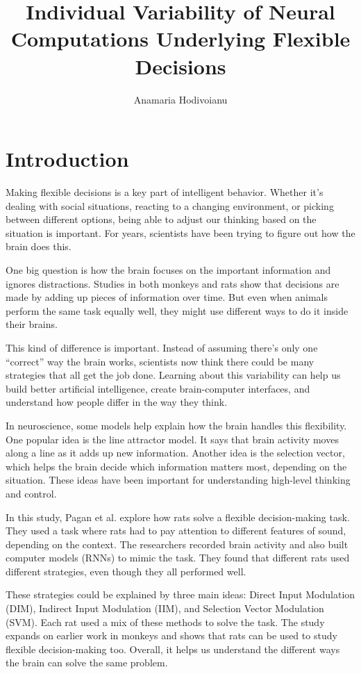 \documentclass{article}
\title{Individual Variability of Neural Computations Underlying Flexible Decisions}
\author{Anamaria Hodivoianu}
\begin{document}
\maketitle

\section{Introduction}
Making flexible decisions is a key part of intelligent behavior. Whether it's dealing with social situations, reacting to a changing environment, or picking between different options, being able to adjust our thinking based on the situation is important. For years, scientists have been trying to figure out how the brain does this.

One big question is how the brain focuses on the important information and ignores distractions. Studies in both monkeys and rats show that decisions are made by adding up pieces of information over time. But even when animals perform the same task equally well, they might use different ways to do it inside their brains.

This kind of difference is important. Instead of assuming there's only one “correct” way the brain works, scientists now think there could be many strategies that all get the job done. Learning about this variability can help us build better artificial intelligence, create brain-computer interfaces, and understand how people differ in the way they think.

In neuroscience, some models help explain how the brain handles this flexibility. One popular idea is the line attractor model. It says that brain activity moves along a line as it adds up new information. Another idea is the selection vector, which helps the brain decide which information matters most, depending on the situation. These ideas have been important for understanding high-level thinking and control.

In this study, Pagan et al. explore how rats solve a flexible decision-making task. They used a task where rats had to pay attention to different features of sound, depending on the context. The researchers recorded brain activity and also built computer models (RNNs) to mimic the task. They found that different rats used different strategies, even though they all performed well.

These strategies could be explained by three main ideas: Direct Input Modulation (DIM), Indirect Input Modulation (IIM), and Selection Vector Modulation (SVM). Each rat used a mix of these methods to solve the task. The study expands on earlier work in monkeys and shows that rats can be used to study flexible decision-making too. Overall, it helps us understand the different ways the brain can solve the same problem.
\end{document}
